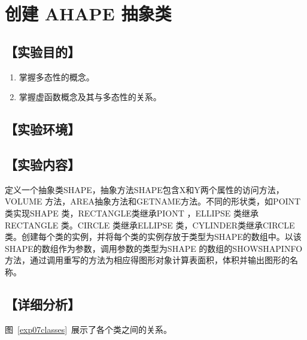 \section{创建 AHAPE 抽象类}
\hfill{}
\subsection*{【实验目的】}
\begin{enumerate}[topsep=0pt,partopsep=0pt,itemsep=0pt,parsep=0pt,label={\arabic*、}]
\item 掌握多态性的概念。
\item 掌握虚函数概念及其与多态性的关系。
\end{enumerate}
\subsection*{【实验环境】}
\MyEnvironment
\subsection*{【实验内容】}
定义一个抽象类SHAPE，抽象方法SHAPE包含X和Y两个属性的访问方法，VOLUME 方法，AREA抽象方法和GETNAME方法。不同的形状类，如POINT 类实现SHAPE 类，RECTANGLE类继承PIONT ，ELLIPSE 类继承RECTANGLE 类。CIRCLE 类继承ELLIPSE 类，CYLINDER类继承CIRCLE类。创建每个类的实例，并将每个类的实例存放于类型为SHAPE的数组中。以该SHAPE的数组作为参数，调用参数的类型为SHAPE 的数组的SHOWSHAPINFO方法，通过调用重写的方法为相应得图形对象计算表面积，体积并输出图形的名称。
\subsection*{【详细分析】}
图~\ref{exp07classes}~展示了各个类之间的关系。

\newcommand\method[2]{{#1}:~{\it #2}}
\newcommand\vart[2]{{#1}:~{\it #2}}
\newcommand\argu[2]{{\sf #2}:~{\it #1}}
\newcommand\comt[1]{\hfill\quad{\tt //#1}}
\newcommand\comtn[1]{\\\comt{#1}}

